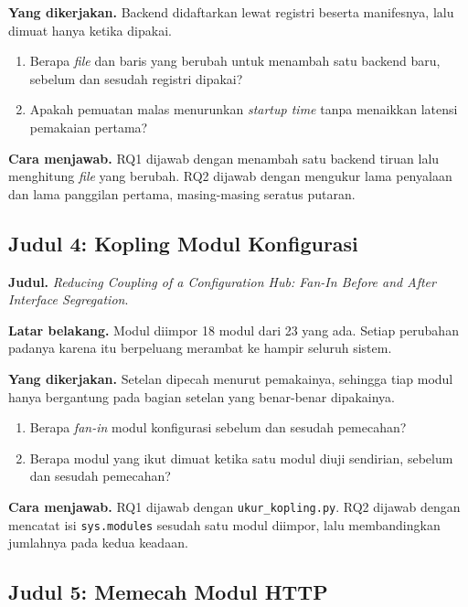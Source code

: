 \textbf{Yang dikerjakan.} Backend didaftarkan lewat registri beserta
manifesnya, lalu dimuat hanya ketika dipakai.

\begin{enumerate}
  \item Berapa \textit{file} dan baris yang berubah untuk menambah satu backend baru,
    sebelum dan sesudah registri dipakai?
  \item Apakah pemuatan malas menurunkan \textit{startup
    time} tanpa menaikkan
    latensi pemakaian pertama?
\end{enumerate}

\textbf{Cara menjawab.} RQ1 dijawab dengan menambah satu backend tiruan lalu
menghitung \textit{file} yang berubah. RQ2 dijawab dengan mengukur lama penyalaan dan
lama panggilan pertama, masing-masing seratus putaran.

\subsection*{Judul 4: Kopling Modul Konfigurasi}

\textbf{Judul.} \textit{Reducing Coupling of a Configuration Hub: Fan-In Before and After Interface Segregation}.

\textbf{Latar belakang.} Modul  diimpor 18 modul dari 23
yang ada. Setiap perubahan padanya karena itu berpeluang merambat ke hampir
seluruh sistem.

\textbf{Yang dikerjakan.} Setelan dipecah menurut pemakainya, sehingga tiap
modul hanya bergantung pada bagian setelan yang benar-benar dipakainya.

\begin{enumerate}
  \item Berapa \textit{fan-in} modul konfigurasi sebelum dan sesudah
    pemecahan?
  \item Berapa modul yang ikut dimuat ketika satu modul diuji sendirian,
    sebelum dan sesudah pemecahan?
\end{enumerate}

\textbf{Cara menjawab.} RQ1 dijawab dengan \texttt{ukur\_kopling.py}. RQ2
dijawab dengan mencatat isi \texttt{sys.modules} sesudah satu modul diimpor,
lalu membandingkan jumlahnya pada kedua keadaan.

\subsection*{Judul 5: Memecah Modul HTTP}

